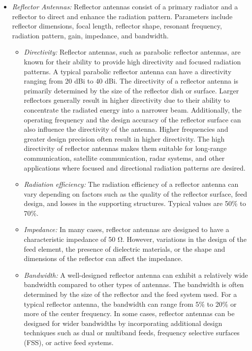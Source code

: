 \documentclass[11pt,a4paper]{article}
\renewcommand{\ohm}{{\mathrm{\Omega}}}
\begin{document}
\begin{itemize}
    \item \emph{Reflector Antennas:} Reflector antennas consist of a primary radiator and a reflector to direct and enhance the radiation pattern. Parameters include reflector dimensions, focal length, reflector shape, resonant frequency, radiation pattern, gain, impedance, and bandwidth.
    \begin{itemize}
        \item \emph{Directivity:} Reflector antennas, such as parabolic reflector antennas, are known for their ability to provide high directivity and focused radiation patterns. A typical parabolic reflector antenna can have a directivity ranging from 20 dBi to 40 dBi. The directivity of a reflector antenna is primarily determined by the size of the reflector dish or surface. Larger reflectors generally result in higher directivity due to their ability to concentrate the radiated energy into a narrower beam. Additionally, the operating frequency and the design accuracy of the reflector surface can also influence the directivity of the antenna. Higher frequencies and greater design precision often result in higher directivity. The high directivity of reflector antennas makes them suitable for long-range communication, satellite communication, radar systems, and other applications where focused and directional radiation patterns are desired.
        \item \emph{Radiation efficiency:} The radiation efficiency of a reflector antenna can vary depending on factors such as the quality of the reflector surface, feed design, and losses in the supporting structures. Typical values are 50\% to 70\%.
        \item \emph{Impedance:} In many cases, reflector antennas are designed to have a characteristic impedance of 50 $\ohm$. However, variations in the design of the feed element, the presence of dielectric materials, or the shape and dimensions of the reflector can affect the impedance.
        \item \emph{Bandwidth:} A well-designed reflector antenna can exhibit a relatively wide bandwidth compared to other types of antennas. The bandwidth is often determined by the size of the reflector and the feed system used. For a typical reflector antenna, the bandwidth can range from 5\% to 20\% or more of the center frequency. In some cases, reflector antennas can be designed for wider bandwidths by incorporating additional design techniques such as dual or multiband feeds, frequency selective surfaces (FSS), or active feed systems.
    \end{itemize}
    

\end{itemize}
\end{document}
